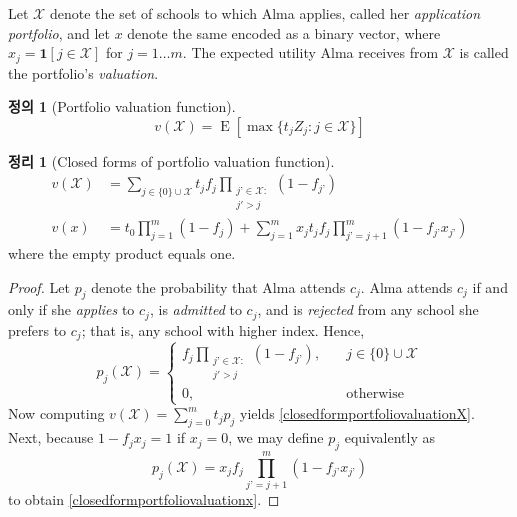 \documentclass[12pt]{article} %
\newtheorem{theorem}{Theorem}
\theoremstyle{definition}
\newtheorem{definition}{Definition}
\newtheorem{theorem}{정리}
\theoremstyle{definition}
\newtheorem{definition}{정의}
\begin{document}
Let $\mathcal{X}$ denote the set of schools to which Alma applies, called her \emph{application portfolio}, and let $x$ denote the same encoded as a binary vector, where $x_j=\mathbf{1}[j\in \mathcal{X}]$ for $j=1\dots m$. The expected utility Alma receives from $\mathcal{X}$ is called the portfolio’s \emph{valuation}.
\begin{definition}[Portfolio valuation function]
\begin{equation} 
v(\mathcal{X}) = \operatorname{E}\left[ \max\{t_j Z_j : j \in \mathcal{X}\} \right]
\end{equation}
\end{definition}
\begin{theorem}[Closed forms of portfolio valuation function]
\begin{align}
v(\mathcal{X}) &= \sum_{j\in\{0\}\cup\mathcal{X}} t_j f_j  \prod_{\substack{j’ \in \mathcal{X}: \\ j' > j}} (1 - f_{j’})  \label{closedformportfoliovaluationX}\\
v(x) &= t_0 \prod_{j=1}^m (1 - f_{j}) + \sum_{j=1}^m x_j t_j f_j \prod_{j’ = j+1}^m (1 - f_{j’} x_{j’}) \label{closedformportfoliovaluationx}
\end{align}
where the empty product equals one.
\end{theorem}
\begin{proof}
Let $p_j$ denote the probability that Alma attends $c_j$. Alma attends $c_j$ if and only if she \emph{applies} to $c_j$, is \emph{admitted} to $c_j$, and is \emph{rejected} from any school she prefers to $c_j$; that is, any school with higher index. Hence,
\begin{equation}
p_j(\mathcal{X}) = 
\begin{cases}
\displaystyle f_j  \prod_{\substack{j’ \in \mathcal{X}: \\ j' > j}} (1 - f_{j’}), \quad & j \in \{0\}\cup\mathcal{X}\\
0, \quad & \text{otherwise}
\end{cases}
\end{equation}
Now computing $v(\mathcal{X}) = \sum_{j=0}^m  t_j p_j$ yields \eqref{closedformportfoliovaluationX}. Next, because $1 - f_j x_j = 1$ if $x_j = 0$, we may define $p_j$ equivalently as
\begin{equation}
p_j(\mathcal{X}) = x_j  f_j \prod_{j’ = j+1}^m (1 - f_{j’} x_{j’})
\end{equation}
to obtain \eqref{closedformportfoliovaluationx}. 
\end{proof}
\end{document}

